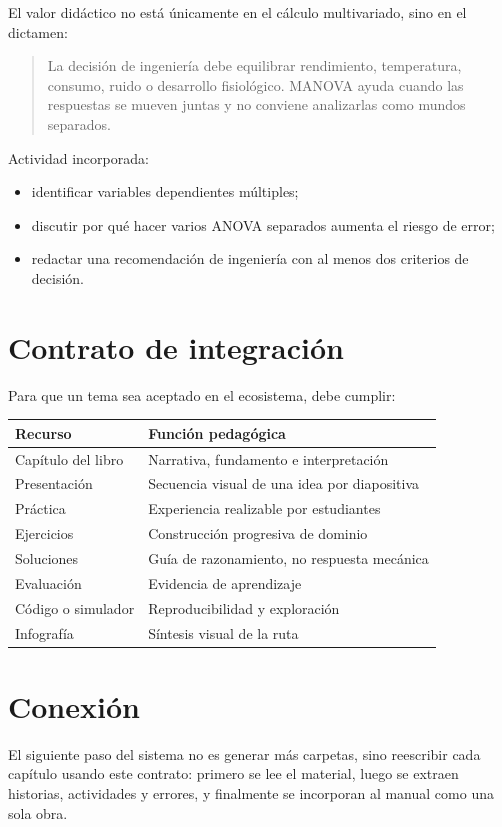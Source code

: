 El valor didáctico no está únicamente en el cálculo multivariado, sino en el dictamen:

\begin{quote}
La decisión de ingeniería debe equilibrar rendimiento, temperatura, consumo, ruido o desarrollo fisiológico. MANOVA ayuda cuando las respuestas se mueven juntas y no conviene analizarlas como mundos separados.
\end{quote}

Actividad incorporada:

\begin{itemize}
  \item identificar variables dependientes múltiples;
  \item discutir por qué hacer varios ANOVA separados aumenta el riesgo de error;
  \item redactar una recomendación de ingeniería con al menos dos criterios de decisión.
\end{itemize}

\section{Contrato de integración}

Para que un tema sea aceptado en el ecosistema, debe cumplir:

\begin{longtable}{p{}p{}}
\toprule
Recurso & Función pedagógica\\
\midrule
Capítulo del libro & Narrativa, fundamento e interpretación\\
Presentación & Secuencia visual de una idea por diapositiva\\
Práctica & Experiencia realizable por estudiantes\\
Ejercicios & Construcción progresiva de dominio\\
Soluciones & Guía de razonamiento, no respuesta mecánica\\
Evaluación & Evidencia de aprendizaje\\
Código o simulador & Reproducibilidad y exploración\\
Infografía & Síntesis visual de la ruta\\
\bottomrule
\end{longtable}

\section{Conexión}

El siguiente paso del sistema no es generar más carpetas, sino reescribir cada capítulo usando este contrato: primero se lee el material, luego se extraen historias, actividades y errores, y finalmente se incorporan al manual como una sola obra.
